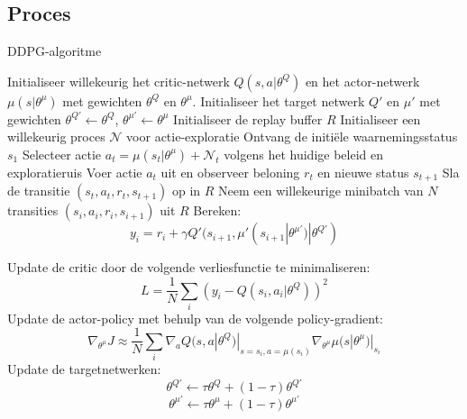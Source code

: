 \documentclass[a4paper,12pt]{report}
\begin{document}
\subsection{Proces}
\begin{algorithm}[h]
    \caption{DDPG-algoritme \cite{lillicrap2019continuouscontroldeepreinforcement} \label{alg:ddpg}}
    \begin{algorithmic}
        \State Initialiseer willekeurig het critic-netwerk $Q(s, a | \theta^Q)$ en het actor-netwerk
        $\mu(s | \theta^{\mu})$ met gewichten $\theta^{Q}$ en $\theta^{\mu}$.
        \State Initialiseer het target netwerk $Q'$ en $\mu'$ met gewichten $\theta^{Q'}
            \leftarrow \theta^{Q}$, $\theta^{\mu'} \leftarrow \theta^{\mu}$
        \State Initialiseer de replay buffer $R$
        \State Initialiseer een willekeurig proces $\mathcal{N}$ voor actie-exploratie
        \State Ontvang de initiële waarnemingsstatus $s_1$
        \State Selecteer actie $a_t = \mu(s_t | \theta^{\mu}) + \mathcal{N}_t$
        volgens het huidige beleid en exploratieruis
        \State Voer actie $a_t$ uit en observeer beloning $r_t$ en nieuwe status $s_{t+1}$
        \State Sla de transitie $(s_t, a_t, r_t, s_{t+1})$ op in $R$
        \State Neem een willekeurige minibatch van $N$ transities $(s_i, a_i, r_i, s_{i+1})$ uit $R$
        \State Bereken:
        \begin{equation}
            y_i = r_i + \gamma Q'(s_{i+1}, \mu'(s_{i+1} | \theta^{\mu'}) | \theta^{Q'})
        \end{equation}

        \State Update de critic door de volgende verliesfunctie te minimaliseren:
        \begin{equation}
            L = \frac{1}{N} \sum_i (y_i - Q(s_i, a_i | \theta^Q))^2
        \end{equation}
        \State Update de actor-policy met behulp van de volgende policy-gradient:
        \begin{equation}
            \nabla_{\theta^{\mu}} J \approx
            \frac{1}{N} \sum_i
            \nabla_{a} Q(s, a | \theta^Q)|_{s = s_i, a = \mu(s_i)}
            \nabla_{\theta^\mu} \mu(s | \theta^\mu)|_{s_i}
        \end{equation}
        \State Update de targetnetwerken:
        \begin{equation}
            \theta^{Q'} \leftarrow \tau \theta^{Q} + (1 - \tau) \theta^{Q'}
        \end{equation}
        \begin{equation}
            \theta^{\mu'} \leftarrow \tau \theta^{\mu} + (1 - \tau) \theta^{\mu'}
        \end{equation}
        \EndFor
        \EndFor
    \end{algorithmic}
\end{algorithm}
\end{document}
